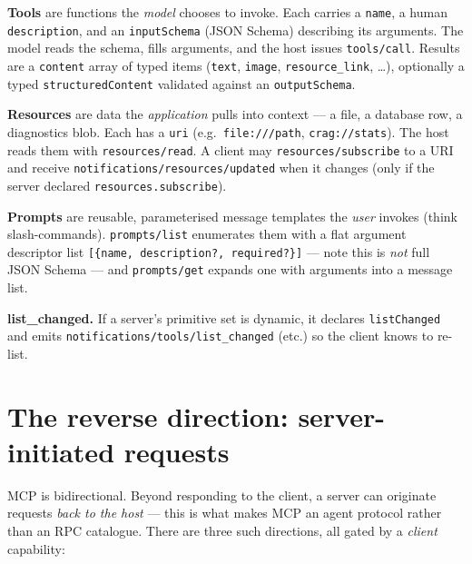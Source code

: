 \documentclass[10pt]{article}
\newcommand{\code}[1]{\texttt{\small #1}}
\begin{document}
\textbf{Tools} are functions the \emph{model} chooses to invoke. Each carries a
\code{name}, a human \code{description}, and an \code{inputSchema} (JSON Schema)
describing its arguments. The model reads the schema, fills arguments, and the
host issues \code{tools/call}. Results are a \code{content} array of typed items
(\code{text}, \code{image}, \code{resource\_link}, \dots), optionally a typed
\code{structuredContent} validated against an \code{outputSchema}.

\textbf{Resources} are data the \emph{application} pulls into context --- a file,
a database row, a diagnostics blob. Each has a \code{uri} (e.g.\
\code{file:///path}, \code{crag://stats}). The host reads them with
\code{resources/read}. A client may \code{resources/subscribe} to a URI and
receive \code{notifications/resources/updated} when it changes (only if the
server declared \code{resources.subscribe}).

\textbf{Prompts} are reusable, parameterised message templates the \emph{user}
invokes (think slash-commands). \code{prompts/list} enumerates them with a flat
argument descriptor list \code{[\{name, description?, required?\}]} --- note this
is \emph{not} full JSON Schema --- and \code{prompts/get} expands one with
arguments into a message list.

\textbf{list\_changed.} If a server's primitive set is dynamic, it declares
\code{listChanged} and emits \code{notifications/tools/list\_changed} (etc.) so
the client knows to re-list.

\section{The reverse direction: server-initiated requests}

MCP is bidirectional. Beyond responding to the client, a server can originate
requests \emph{back to the host} --- this is what makes MCP an agent protocol
rather than an RPC catalogue. There are three such directions, all gated by a
\emph{client} capability:
\end{document}
